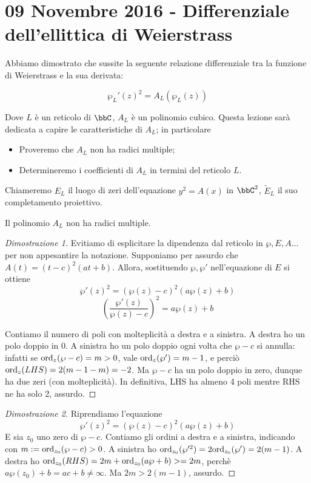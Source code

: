 \chapter{09 Novembre 2016 - Differenziale dell'ellittica di Weierstrass}
Abbiamo dimostrato che sussite la seguente relazione differenziale tra la funzione di Weierstrass e la sua derivata:

$$\wp_L'(z)^2 = A_L(\wp_L(z)) $$

Dove $L$ è un reticolo di $\bbC$,  $A_L$ è un polinomio cubico. Questa lezione sarà dedicata a capire le caratteristiche di $A_L$; in particolare
\begin{itemize}
\item Proveremo che $A_L$ non ha radici multiple;
\item Determineremo i coefficienti di $A_L$ in termini del reticolo $L$.
\end{itemize}

Chiameremo $E_L$ il luogo di zeri dell'equazione $y^2=A(x)$ in $\bbC^2$, $\tilde{E}_L$ il suo completamento proiettivo.
\begin{proposizione}
Il polinomio $A_L$ non ha radici multiple.
\end{proposizione}

\begin{proof}[Dimostrazione 1]
Evitiamo di esplicitare la dipendenza dal reticolo in $\wp, E,A \dots$ per non appesantire la notazione. Supponiamo per assurdo che $A(t) = (t-c)^2(at+b)$. Allora, sostituendo $\wp, \wp'$ nell'equazione di $E$ si ottiene
$$\wp'(z)^2 = (\wp(z) - c)^2(a\wp(z)+b) $$
$$ \left ( \frac{\wp'(z)}{\wp(z)-c} \right )^2 = a\wp(z)+b $$

Contiamo il numero di poli con molteplicità a destra e a sinistra. A destra ho un polo doppio in $0$. A sinistra ho un polo doppio ogni volta che $\wp - c$ si annulla: infatti se $\text{ord}_{z}(\wp -c) = m > 0$, vale $\text{ord}_{z}(\wp') = m-1$, e perciò $\text{ord}_{z}(LHS) = 2(m-1-m) = -2$. Ma $\wp-c$ ha un polo doppio in zero, dunque ha due zeri (con molteplicità). In definitiva, LHS ha almeno 4 poli mentre RHS ne ha solo 2, assurdo.
\end{proof}

\begin{proof}[Dimostrazione 2]
Riprendiamo l'equazione 
$$\wp'(z)^2 = (\wp(z) - c)^2(a\wp(z)+b) $$
E sia $z_0$ uno zero di $\wp-c$. Contiamo gli ordini a destra e a sinistra, indicando con $m:=\text{ord}_{z_0}(\wp-c) > 0$. 
A sinistra ho $\text{ord}_{z_0}( \wp'^2) = 2\text{ord}_{z_0}( \wp') = 2(m-1)$. A destra ho $\text{ord}_{z_0}(RHS) = 2m + \text{ord}_{z_0}(a\wp+b) >= 2m$, perchè $a \wp(z_0)+b = ac+b \neq \infty$. Ma $2m> 2(m-1)$, assurdo.
\end{proof}

